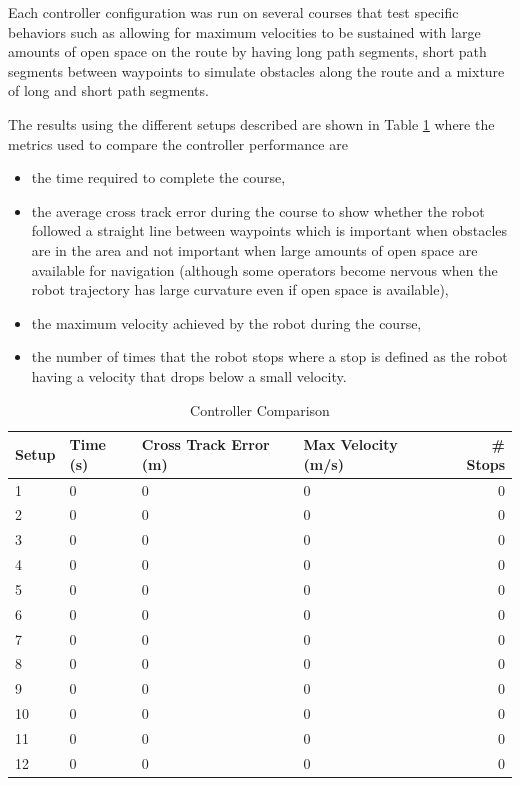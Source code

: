 Each controller configuration was run on several courses that test specific behaviors such as allowing for maximum velocities to be sustained with large amounts of open space on the route by having long path segments, short path segments between waypoints to simulate obstacles along the route and a mixture of long and short path segments.

The results using the different setups described are shown in Table \ref{tab:resultsControllers} where the metrics used to compare the controller performance are
\begin{itemize}
\item the time required to complete the course,
\item the average cross track error during the course to show whether the robot followed a straight line between waypoints which is important when obstacles are in the area and not important when large amounts of open space are available for navigation (although some operators become nervous when the robot trajectory has large curvature even if open space is available),
\item the maximum velocity achieved by the robot during the course,
\item the number of times that the robot stops where a stop is defined as the robot having a velocity that drops below a small velocity.
\end{itemize}

\begin{table}[ht!]
\caption{Controller Comparison}
\small
\centering
\begin{tabular}{@{}llllr@{}} \toprule
Setup & Time (s) & Cross Track Error (m) & Max Velocity (m/s) & \# Stops \\ \midrule
1     & 0        & 0                     & 0                  & 0        \\
2     & 0        & 0                     & 0                  & 0        \\
3     & 0        & 0                     & 0                  & 0        \\
4     & 0        & 0                     & 0                  & 0        \\
5     & 0        & 0                     & 0                  & 0        \\
6     & 0        & 0                     & 0                  & 0        \\
7     & 0        & 0                     & 0                  & 0        \\
8     & 0        & 0                     & 0                  & 0        \\
9     & 0        & 0                     & 0                  & 0        \\
10    & 0        & 0                     & 0                  & 0        \\
11    & 0        & 0                     & 0                  & 0        \\
12    & 0        & 0                     & 0                  & 0        \\ \bottomrule
\end{tabular}
\label{tab:resultsControllers}
\end{table}
